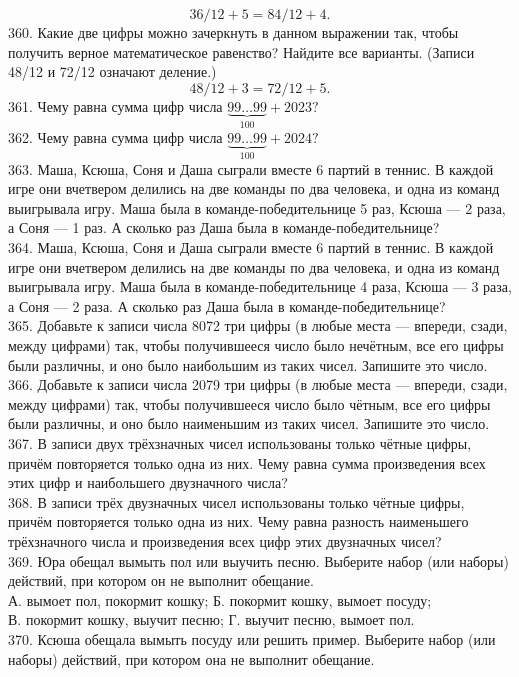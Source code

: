 \documentclass[12pt]{article}
\begin{document}
$$ 36/12+5=84/12+4.$$
360. Какие две цифры можно зачеркнуть в данном выражении так, чтобы получить верное математическое равенство? Найдите все варианты. (Записи 48/12 и 72/12 означают деление.)
$$48/12+3=72/12+5.$$
361. Чему равна сумма цифр числа $\underbrace{99\ldots99}_{100}+2023?$\\
362. Чему равна сумма цифр числа $\underbrace{99\ldots99}_{100}+2024?$\\
363. Маша, Ксюша, Соня и Даша сыграли вместе 6 партий в теннис. В каждой игре они вчетвером делились на две команды по два человека, и одна из команд выигрывала игру. Маша была в команде-победительнице 5 раз, Ксюша --- 2 раза, а Соня --- 1 раз. А сколько раз Даша была в команде-победительнице?\\
364. Маша, Ксюша, Соня и Даша сыграли вместе 6 партий в теннис. В каждой игре они вчетвером делились на две команды по два человека, и одна из команд выигрывала игру. Маша была в команде-победительнице 4 раза, Ксюша --- 3 раза, а Соня --- 2 раза. А сколько раз Даша была в команде-победительнице?\\
365. Добавьте к записи числа 8072 три цифры (в любые места --- впереди, сзади, между цифрами) так, чтобы получившееся число было нечётным, все его цифры были различны, и оно было наибольшим из таких чисел. Запишите это число.\\
366. Добавьте к записи числа 2079 три цифры (в любые места --- впереди, сзади, между цифрами) так, чтобы получившееся число было чётным, все его цифры были различны, и оно было наименьшим из таких чисел. Запишите это число.\\
367. В записи двух трёхзначных чисел использованы только чётные цифры, причём повторяется только одна из них. Чему равна сумма произведения всех этих цифр
и наибольшего двузначного числа?\\
368. В записи трёх двузначных чисел использованы только чётные цифры, причём повторяется только одна из них. Чему равна разность наименьшего
трёхзначного числа и произведения всех цифр этих двузначных чисел?\\
369. Юра обещал вымыть пол или выучить песню. Выберите набор (или наборы) действий, при котором он не выполнит обещание.\\
А. вымоет пол, покормит кошку;  \qquad \qquad Б. покормит кошку, вымоет посуду;\\
В. покормит кошку, выучит песню; \qquad \quad Г. выучит песню, вымоет пол.\\
370. Ксюша обещала вымыть посуду или решить пример. Выберите набор (или наборы) действий, при котором она не выполнит обещание.\\
\end{document}
